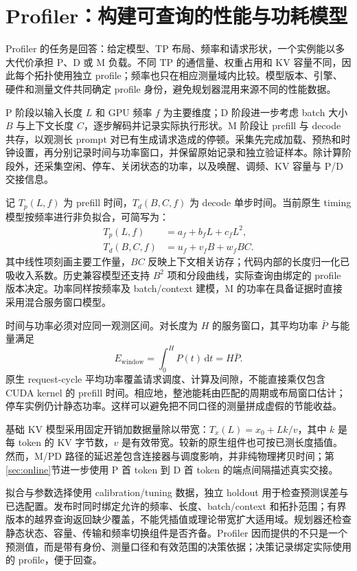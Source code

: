 \section{Profiler：构建可查询的性能与功耗模型}
\label{sec:profiler}
Profiler 的任务是回答：给定模型、TP 布局、频率和请求形状，一个实例能以多大代价承担 P、D 或 M 负载。不同 TP 的通信量、权重占用和 KV 容量不同，因此每个拓扑使用独立 profile；频率也只在相应测量域内比较。模型版本、引擎、硬件和测量文件共同确定 profile 身份，避免规划器混用来源不同的性能数据。

P 阶段以输入长度 $L$ 和 GPU 频率 $f$ 为主要维度；D 阶段进一步考虑 batch 大小 $B$ 与上下文长度 $C$，逐步解码并记录实际执行形状。M 阶段让 prefill 与 decode 共存，以观测长 prompt 对已有生成请求造成的停顿。采集先完成加载、预热和时钟设置，再分别记录时间与功率窗口，并保留原始记录和独立验证样本。除计算阶段外，还采集空闲、停车、关闭状态的功率，以及唤醒、调频、KV 容量与 P/D 交接信息。

记 $T_p(L,f)$ 为 prefill 时间，$T_d(B,C,f)$ 为 decode 单步时间。当前原生 timing 模型按频率进行非负拟合，可简写为：
\begin{align}
 T_p(L,f)&=a_f+b_fL+c_fL^2,\\
 T_d(B,C,f)&=u_f+v_fB+w_fBC.
\end{align}
其中线性项刻画主要工作量，$BC$ 反映上下文相关访存；代码内部的长度归一化已吸收入系数。历史兼容模型还支持 $B^2$ 项和分段曲线，实际查询由绑定的 profile 版本决定。功率同样按频率及 batch/context 建模，M 的功率在具备证据时直接采用混合服务窗口模型。

时间与功率必须对应同一观测区间。对长度为 $H$ 的服务窗口，其平均功率 $\bar P$ 与能量满足
\begin{equation}
 E_{\mathrm{window}}=\int_0^H P(t)\,\mathrm{d}t=H\bar P.
\end{equation}
原生 request-cycle 平均功率覆盖请求调度、计算及间隙，不能直接乘仅包含 CUDA kernel 的 prefill 时间。相应地，整池能耗由匹配的周期或布局窗口估计；停车实例仍计静态功率。这样可以避免把不同口径的测量拼成虚假的节能收益。

基础 KV 模型采用固定开销加数据量除以带宽：$T_x(L)=x_0+Lk/v$，其中 $k$ 是每 token 的 KV 字节数，$v$ 是有效带宽。较新的原生组件也可按已测长度插值。然而，M/PD 路径的延迟差包含连接器与调度影响，并非纯物理拷贝时间；第\ref{sec:online}节进一步使用 P 首 token 到 D 首 token 的端点间隔描述真实交接。

拟合与参数选择使用 calibration/tuning 数据，独立 holdout 用于检查预测误差与已选配置。发布时同时绑定允许的频率、长度、batch/context 和拓扑范围；有界版本的越界查询返回缺少覆盖，不能凭插值或理论带宽扩大适用域。规划器还检查静态状态、容量、传输和频率切换组件是否齐备。Profiler 因而提供的不只是一个预测值，而是带有身份、测量口径和有效范围的决策依据；决策记录绑定实际使用的 profile，便于回查。
